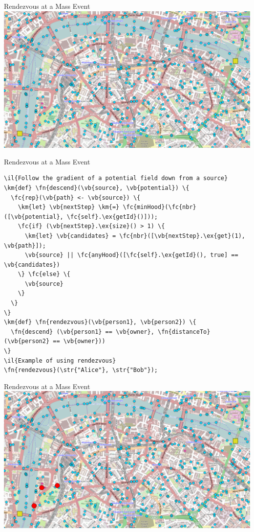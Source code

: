 \documentclass[presentation]{beamer} %
\newcommand{\il}[1]{{\it \textcolor{gray}{// #1}}} %
\newcommand{\km}[1]{\textcolor{purple}{#1}} %
\newcommand{\ex}[1]{\textcolor{blue}{#1}} %
\newcommand{\fc}[1]{\textcolor{Fuchsia}{#1}} %
\newcommand{\fn}[1]{\textcolor{blue}{#1}} %
\newcommand{\vb}[1]{\textcolor{OliveGreen}{#1}} %
\newcommand{\str}[1]{\textcolor{darkgray}{#1}} %
\begin{document}
\begin{frame}{Rendezvous at a Mass Event}
  \centering
  \includegraphics[width=\textwidth{}]{imgs/screenshots/london0}
\end{frame}

\begin{frame}[fragile]{Rendezvous at a Mass Event}
\begin{Verbatim}[fontsize=\scriptsize, frame=single, commandchars=\\\{\}]
\il{Follow the gradient of a potential field down from a source}
\km{def} \fn{descend}(\vb{source}, \vb{potential}) \{
  \fc{rep}(\vb{path} <- \vb{source}) \{
    \km{let} \vb{nextStep} \km{=} \fc{minHood}(\fc{nbr}([\vb{potential}, \fc{self}.\ex{getId}()]));
    \fc{if} (\vb{nextStep}.\ex{size}() > 1) \{
      \km{let} \vb{candidates} = \fc{nbr}([\vb{nextStep}.\ex{get}(1), \vb{path}]);
      \vb{source} || \fc{anyHood}([\fc{self}.\ex{getId}(), true] == \vb{candidates})
    \} \fc{else} \{
      \vb{source}
    \}
  \}
\}
\km{def} \fn{rendezvous}(\vb{person1}, \vb{person2}) \{
  \fn{descend} (\vb{person1} == \vb{owner}, \fn{distanceTo}(\vb{person2} == \vb{owner}))
\}
\il{Example of using rendezvous}
\fn{rendezvous}(\str{"Alice"}, \str{"Bob"});
\end{Verbatim}
\end{frame}

\begin{frame}{Rendezvous at a Mass Event}
  \centering
  \includegraphics[width=\textwidth{}]{imgs/screenshots/london1}
\end{frame}
\end{document}

